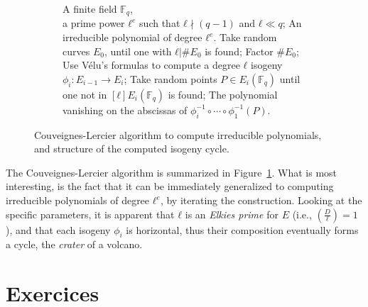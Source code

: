 \documentclass[10pt]{article}
\theoremstyle{plain}
\theoremstyle{definition}
\def\F{\ensuremath{\mathbb{F}}}
\begin{document}
\begin{figure}
  \begin{subfigure}{0.65\textwidth}
    \begin{algorithmic}[1]
      \REQUIRE A finite field $\F_q$,\\
      a prime power $ℓ^e$ such that $ℓ\nmid(q-1)$ and $ℓ\ll q$;
      \ENSURE An irreducible polynomial of degree $ℓ^e$.
      \STATE Take random curves $E_0$, until one with $ℓ|\#E_0$ is found;
      \STATE Factor $\#E_0$;
      \STATE Use V\'elu's formulas to compute a degree $ℓ$ isogeny $ϕ_i:E_{i-1}\to E_i$;
      \ENDFOR
      \STATE Take random points $P\in E_i(\F_q)$ until one not in $[ℓ]E_i(\F_q)$ is found;
      \RETURN The polynomial vanishing on the abscissas of $ϕ_i^{-1}∘\cdots∘ϕ_1^{-1}(P)$.
    \end{algorithmic}
  \end{subfigure}
  \hfill
  \begin{subfigure}{0.2\textwidth}
  \end{subfigure}
  
  \caption{Couveignes-Lercier algorithm to compute irreducible
    polynomials, and structure of the computed isogeny cycle.}
  \label{fig:CL}
\end{figure}

The Couveignes-Lercier algorithm is summarized in
Figure~\ref{fig:CL}. %
What is most interesting, is the fact that it can be immediately
generalized to computing irreducible polynomials of degree $ℓ^e$, by
iterating the construction. %
Looking at the specific parameters, it is apparent that $ℓ$ is an
\emph{Elkies prime} for $E$ (i.e., $\left(\frac{D}{ℓ}\right)=1$), and
that each isogeny $ϕ_i$ is horizontal, thus their composition
eventually forms a cycle, the \emph{crater} of a volcano.


\section*{Exercices}
\end{document}
